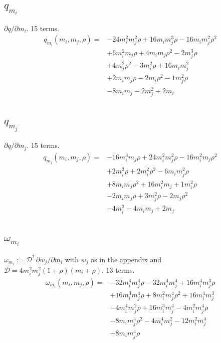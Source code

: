\subsection*{$q_{m_i}$}
$\partial q/\partial m_i$. 15 terms.
{\small
\begin{align*}
q_{m_i}(m_i,m_j,\rho)={}&-24m_i^{2}m_j^{2}\rho+16m_im_j^{3}\rho-16m_im_j^{2}\rho^{2}\\
&+6m_i^{2}m_j\rho+4m_im_j\rho^{2}-2m_j^{3}\rho\\
&+4m_j^{2}\rho^{2}-3m_i^{2}\rho+16m_im_j^{2}\\
&+2m_im_j\rho-2m_i\rho^{2}-1m_j^{2}\rho\\
&-8m_im_j-2m_j^{2}+2m_i
\end{align*}
}

\subsection*{$q_{m_j}$}
$\partial q/\partial m_j$. 15 terms.
{\small
\begin{align*}
q_{m_j}(m_i,m_j,\rho)={}&-16m_i^{3}m_j\rho+24m_i^{2}m_j^{2}\rho-16m_i^{2}m_j\rho^{2}\\
&+2m_i^{3}\rho+2m_i^{2}\rho^{2}-6m_im_j^{2}\rho\\
&+8m_im_j\rho^{2}+16m_i^{2}m_j+1m_i^{2}\rho\\
&-2m_im_j\rho+3m_j^{2}\rho-2m_j\rho^{2}\\
&-4m_i^{2}-4m_im_j+2m_j
\end{align*}
}

\subsection*{$\omega_{m_i}$}
$\omega_{m_i}:=\mathcal D^2\,\partial w_j/\partial m_i$ with $w_j$ as in the appendix and $\mathcal D=4m_i^2m_j^2(1+\rho)(m_i+\rho)$. 13 terms.
{\small
\begin{align*}
\omega_{m_i}(m_i,m_j,\rho)={}&-32m_i^{4}m_j^{4}\rho-32m_i^{4}m_j^{4}+16m_i^{4}m_j^{3}\rho\\
&+16m_i^{3}m_j^{4}\rho+8m_i^{2}m_j^{4}\rho^{2}+16m_i^{4}m_j^{3}\\
&-4m_i^{4}m_j^{2}\rho+16m_i^{3}m_j^{4}-4m_i^{2}m_j^{4}\rho\\
&-8m_im_j^{4}\rho^{2}-4m_i^{4}m_j^{2}-12m_i^{2}m_j^{4}\\
&-8m_im_j^{4}\rho
\end{align*}
}

